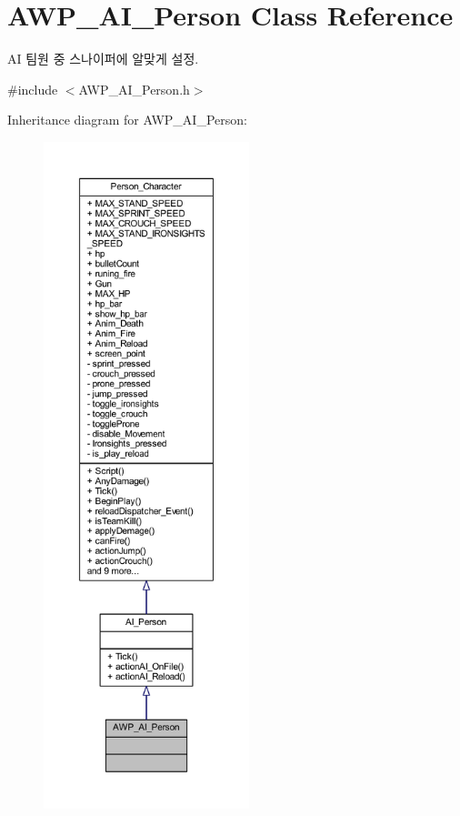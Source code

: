 \hypertarget{class_a_w_p___a_i___person}{}\section{A\+W\+P\+\_\+\+A\+I\+\_\+\+Person Class Reference}
\label{class_a_w_p___a_i___person}


AI 팀원 중 스나이퍼에 알맞게 설정.  




{\ttfamily \#include $<$A\+W\+P\+\_\+\+A\+I\+\_\+\+Person.\+h$>$}



Inheritance diagram for A\+W\+P\+\_\+\+A\+I\+\_\+\+Person\+:\nopagebreak
\begin{figure}[H]
\begin{center}
\leavevmode
\includegraphics[height=550pt]{class_a_w_p___a_i___person__inherit__graph}
\end{center}
\end{figure}



